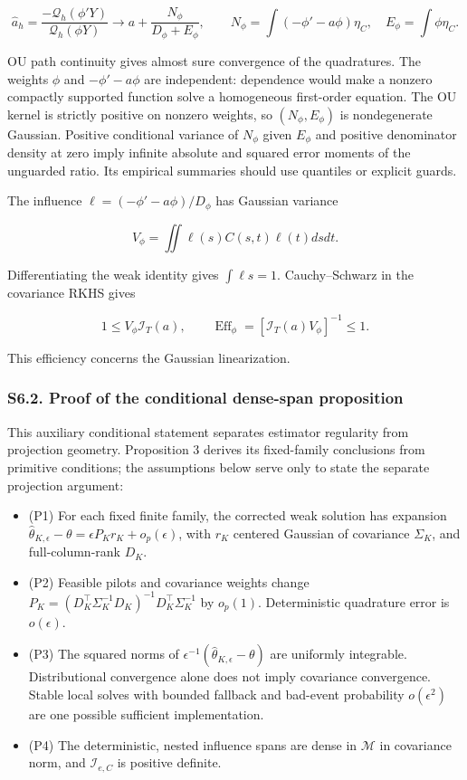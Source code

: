 \documentclass[
  american,
  11pt,
]{article}
\providecommand{\tightlist}{%
  \setlength{\itemsep}{0pt}\setlength{\parskip}{0pt}}
\begin{document}
\[
\widehat a_h=\frac{-\mathcal Q_h(\phi'Y)}{\mathcal Q_h(\phi Y)}
\longrightarrow a+\frac{N_\phi}{D_\phi+E_\phi},\qquad
N_\phi=\int(-\phi'-a\phi)\eta_C,\quad E_\phi=\int\phi\eta_C.
\]

OU path continuity gives almost sure convergence of the quadratures. The
weights \(\phi\) and \(-\phi'-a\phi\) are independent: dependence would
make a nonzero compactly supported function solve a homogeneous
first-order equation. The OU kernel is strictly positive on nonzero
weights, so \((N_\phi,E_\phi)\) is nondegenerate Gaussian. Positive
conditional variance of \(N_\phi\) given \(E_\phi\) and positive
denominator density at zero imply infinite absolute and squared error
moments of the unguarded ratio. Its empirical summaries should use
quantiles or explicit guards.

The influence \(\ell=(-\phi'-a\phi)/D_\phi\) has Gaussian variance

\[
V_\phi=\iint\ell(s)C(s,t)\ell(t)dsdt.
\]

Differentiating the weak identity gives \(\int\ell s=1\).
Cauchy--Schwarz in the covariance RKHS gives

\[
1\leq V_\phi\mathcal I_T(a),\qquad
\operatorname{Eff}_\phi=[\mathcal I_T(a)V_\phi]^{-1}\leq1.
\]

This efficiency concerns the Gaussian linearization.

\subsubsection{S6.2. Proof of the conditional dense-span
proposition}\label{s6.2.-proof-of-the-conditional-dense-span-proposition}

This auxiliary conditional statement separates estimator regularity from
projection geometry. Proposition 3 derives its fixed-family conclusions
from primitive conditions; the assumptions below serve only to state the
separate projection argument:

\begin{itemize}
\tightlist
\item
  (P1) For each fixed finite family, the corrected weak solution has
  expansion
  \(\widehat\theta_{K,\epsilon}-\theta=\epsilon P_K r_K+o_p(\epsilon)\),
  with \(r_K\) centered Gaussian of covariance \(\Sigma_K\), and
  full-column-rank \(D_K\).
\item
  (P2) Feasible pilots and covariance weights change
  \(P_K=(D_K^\top\Sigma_K^{-1}D_K)^{-1}D_K^\top\Sigma_K^{-1}\) by
  \(o_p(1)\). Deterministic quadrature error is \(o(\epsilon)\).
\item
  (P3) The squared norms of
  \(\epsilon^{-1}(\widehat\theta_{K,\epsilon}-\theta)\) are uniformly
  integrable. Distributional convergence alone does not imply covariance
  convergence. Stable local solves with bounded fallback and bad-event
  probability \(o(\epsilon^2)\) are one possible sufficient
  implementation.
\item
  (P4) The deterministic, nested influence spans are dense in
  \(\mathcal M\) in covariance norm, and \(\mathcal I_{e,C}\) is
  positive definite.
\end{itemize}
\end{document}

